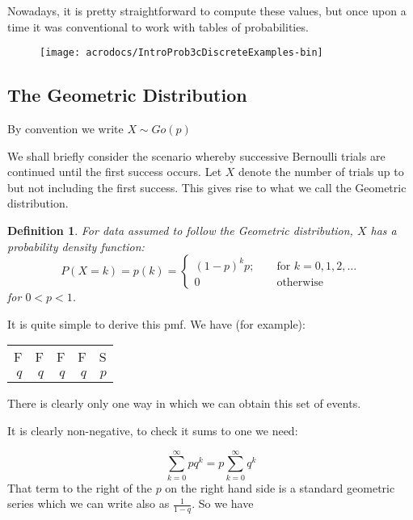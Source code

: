 \documentclass[12pt]{extbook}
\newtheorem{df}{Definition}[section]
\begin{document}


Nowadays, it is pretty straightforward to compute these values, but
once upon a time it was conventional to work with tables of
probabilities.  
\begin{figure}
\texttt{[image: acrodocs/IntroProb3cDiscreteExamples-bin]}
\end{figure}

\clearpage

\subsection{The Geometric Distribution}

{\color{green} By convention we write $X \sim Go(p)$} 

We shall briefly consider the scenario whereby successive Bernoulli trials are continued until the first success occurs.   Let $X$ denote the number of trials up to but not including the first success.   This gives rise to what we call the Geometric distribution.   

\begin{df}
For data assumed to follow the Geometric distribution, $X$ has a probability density function:
\begin{displaymath}
P(X=k) = p(k) =  \left\{ \begin{array}{crr} (1-p)^{k}p; & & \mbox{ for } k=0,1,2,\ldots\\
0 & & \mbox{ otherwise } \end{array} \right.
\end{displaymath}
for $0 < p < 1$.
\end{df}



It is quite simple to derive this pmf.   We have (for example):
\begin{tabular}{rrrrr}
F & F & F & F & S \\
$q$ & $q$ & $q$ & $q$ & $p$
\end{tabular}

There is clearly only one way in which we can obtain this set of events.

It is clearly non-negative, to check it sums to one we need:

\begin{displaymath}
\sum_{k=0}^{\infty} pq^{k} = p \sum_{k=0}^{\infty} q^{k}
\end{displaymath}
That term to the right of the $p$ on the right hand side is a standard geometric series which we can write also as $\frac{1}{1-q}$.   So we have 
\end{document}
